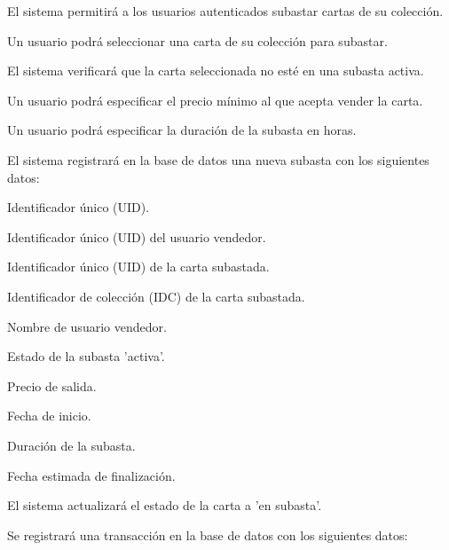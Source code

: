 

 \label{req_subastas_pujas}
\hypertarget{req_subastas_pujas}{}
\begin{RFSubastas}
	\item El sistema permitirá a los usuarios autenticados subastar cartas de su colección.
	\begin{RFSubastas}
		\item Un usuario podrá seleccionar una carta de su colección para subastar.
		\item El sistema verificará que la carta seleccionada no esté en una subasta activa.
		\item Un usuario podrá especificar el precio mínimo al que acepta vender la carta.
		\item Un usuario podrá especificar la duración de la subasta en horas.
		\item El sistema registrará en la base de datos una nueva subasta con los siguientes datos:
		\begin{RFSubastas}
			\item Identificador único (UID).
			\item Identificador único (UID) del usuario vendedor.
			\item Identificador único (UID) de la carta subastada.
			\item Identificador de colección (IDC) de la carta subastada.
			\item Nombre de usuario vendedor.
			\item Estado de la subasta 'activa'.
			\item Precio de salida.
			\item Fecha de inicio.
			\item Duración de la subasta.
			\item Fecha estimada de finalización.
		\end{RFSubastas}
		\item El sistema actualizará el estado de la carta a 'en subasta'.
		\item Se registrará una transacción en la base de datos con los siguientes datos:

\end{RFSubastas}
\end{RFSubastas}
